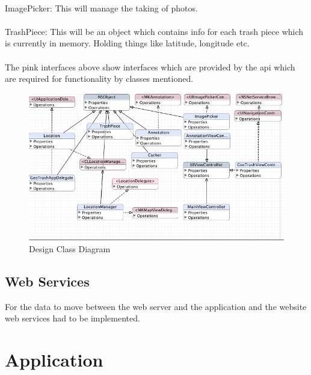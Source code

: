 \documentclass[12pt]{article}
\begin{document}
\paragraph{}
ImagePicker:
This will manage the taking of photos.

\paragraph{}
TrashPiece:
This will be an object which contains info for each trash piece which is currently in memory. Holding things like latitude, longitude etc.

\paragraph{}

The pink interfaces above show interfaces which are provided by the \gls{api} which are required for functionality by classes mentioned. 

\begin{figure}[htb]
\begin{center}
\leavevmode
\includegraphics[scale =0.8 ,angle=90]{class}
\end{center}
\caption{Design Class Diagram}
\label{fig:class}
\end{figure}


\subsection{Web Services}
For the data to move between the web server and the application and the website web services had to be implemented. 

\section{Application}
\end{document}
